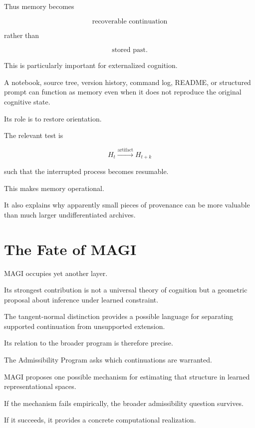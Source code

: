 \documentclass[11pt]{article}
\theoremstyle{remark}
\newcommand{\MAGI}{\textsc{MAGI}}
\begin{document}
Thus memory becomes

\begin{equation}
\text{recoverable continuation}
\end{equation}

rather than

\begin{equation}
\text{stored past}.
\end{equation}

This is particularly important for externalized cognition.

A notebook, source tree, version history, command log, README, or structured prompt can function as memory even when it does not reproduce the original cognitive state.

Its role is to restore orientation.

The relevant test is

\begin{equation}
H_t
\xrightarrow{\text{artifact}}
H_{t+k}
\end{equation}

such that the interrupted process becomes resumable.

This makes memory operational.

It also explains why apparently small pieces of provenance can be more valuable than much larger undifferentiated archives.

\section{The Fate of MAGI}

\MAGI{} occupies yet another layer.

Its strongest contribution is not a universal theory of cognition but a geometric proposal about inference under learned constraint.

The tangent-normal distinction provides a possible language for separating supported continuation from unsupported extension.

Its relation to the broader program is therefore precise.

The Admissibility Program asks which continuations are warranted.

\MAGI{} proposes one possible mechanism for estimating that structure in learned representational spaces.

If the mechanism fails empirically, the broader admissibility question survives.

If it succeeds, it provides a concrete computational realization.
\end{document}
